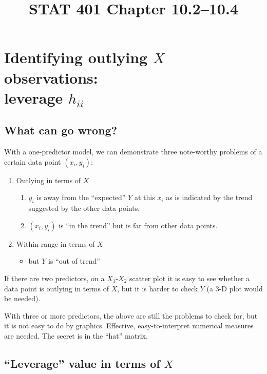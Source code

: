 \documentclass[12pt]{article}
\begin{document}
\title{STAT 401 Chapter 10.2--10.4}
\maketitle

\section{Identifying outlying $X$ observations:\\ leverage $h_{ii}$}

\subsection{What can go wrong?}

With a one-predictor model, we can demonstrate
three note-worthy problems of a certain data point $(x_i, y_i)$:

\begin{enumerate}
\item Outlying in terms of $X$
    \begin{enumerate}
        \item $y_i$ is away from the ``expected'' $Y$ at this $x_i$
            as is indicated by the trend suggested by the other data points.
        \item $(x_i, y_i)$ is ``in the trend'' but is far from other data
            points.
    \end{enumerate}
\item Within range in terms of $X$
    \begin{itemize}
        \item but $Y$ is ``out of trend''
    \end{itemize}
\end{enumerate}

If there are two predictors, on a $X_1$-$X_2$ scatter plot
it is easy to see whether a data point is outlying in terms of $X$,
but it is harder to check $Y$ (a 3-D plot would be needed).

With three or more predictors,
the above are still the problems to check for,
but it is not easy to do by graphics.
Effective, easy-to-interpret numerical measures are needed.
The secret is in the ``hat'' matrix.

\subsection{``Leverage'' value in terms of $X$}
\end{document}
